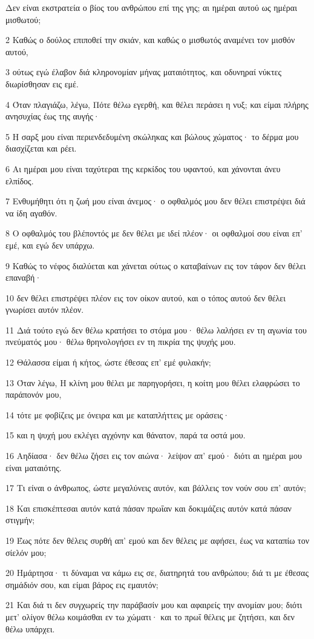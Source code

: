 \par Δεν είναι εκστρατεία ο βίος του ανθρώπου επί της γης; αι ημέραι αυτού ως ημέραι μισθωτού;
\par 2 Καθώς ο δούλος επιποθεί την σκιάν, και καθώς ο μισθωτός αναμένει τον μισθόν αυτού,
\par 3 ούτως εγώ έλαβον διά κληρονομίαν μήνας ματαιότητος, και οδυνηραί νύκτες διωρίσθησαν εις εμέ.
\par 4 Όταν πλαγιάζω, λέγω, Πότε θέλω εγερθή, και θέλει περάσει η νυξ; και είμαι πλήρης ανησυχίας έως της αυγής·
\par 5 Η σαρξ μου είναι περιενδεδυμένη σκώληκας και βώλους χώματος· το δέρμα μου διασχίζεται και ρέει.
\par 6 Αι ημέραι μου είναι ταχύτεραι της κερκίδος του υφαντού, και χάνονται άνευ ελπίδος.
\par 7 Ενθυμήθητι ότι η ζωή μου είναι άνεμος· ο οφθαλμός μου δεν θέλει επιστρέψει διά να ίδη αγαθόν.
\par 8 Ο οφθαλμός του βλέποντός με δεν θέλει με ιδεί πλέον· οι οφθαλμοί σου είναι επ' εμέ, και εγώ δεν υπάρχω.
\par 9 Καθώς το νέφος διαλύεται και χάνεται ούτως ο καταβαίνων εις τον τάφον δεν θέλει επαναβή·
\par 10 δεν θέλει επιστρέψει πλέον εις τον οίκον αυτού, και ο τόπος αυτού δεν θέλει γνωρίσει αυτόν πλέον.
\par 11 Διά τούτο εγώ δεν θέλω κρατήσει το στόμα μου· θέλω λαλήσει εν τη αγωνία του πνεύματός μου· θέλω θρηνολογήσει εν τη πικρία της ψυχής μου.
\par 12 Θάλασσα είμαι ή κήτος, ώστε έθεσας επ' εμέ φυλακήν;
\par 13 Όταν λέγω, Η κλίνη μου θέλει με παρηγορήσει, η κοίτη μου θέλει ελαφρώσει το παράπονόν μου,
\par 14 τότε με φοβίζεις με όνειρα και με καταπλήττεις με οράσεις·
\par 15 και η ψυχή μου εκλέγει αγχόνην και θάνατον, παρά τα οστά μου.
\par 16 Αηδίασα· δεν θέλω ζήσει εις τον αιώνα· λείψον απ' εμού· διότι αι ημέραι μου είναι ματαιότης.
\par 17 Τι είναι ο άνθρωπος, ώστε μεγαλύνεις αυτόν, και βάλλεις τον νούν σου επ' αυτόν;
\par 18 Και επισκέπτεσαι αυτόν κατά πάσαν πρωΐαν και δοκιμάζεις αυτόν κατά πάσαν στιγμήν;
\par 19 Έως πότε δεν θέλεις συρθή απ' εμού και δεν θέλεις με αφήσει, έως να καταπίω τον σίελόν μου;
\par 20 Ημάρτησα· τι δύναμαι να κάμω εις σε, διατηρητά του ανθρώπου; διά τι με έθεσας σημάδιόν σου, και είμαι βάρος εις εμαυτόν;
\par 21 Και διά τι δεν συγχωρείς την παράβασίν μου και αφαιρείς την ανομίαν μου; διότι μετ' ολίγον θέλω κοιμάσθαι εν τω χώματι· και το πρωΐ θέλεις με ζητήσει, και δεν θέλω υπάρχει.

